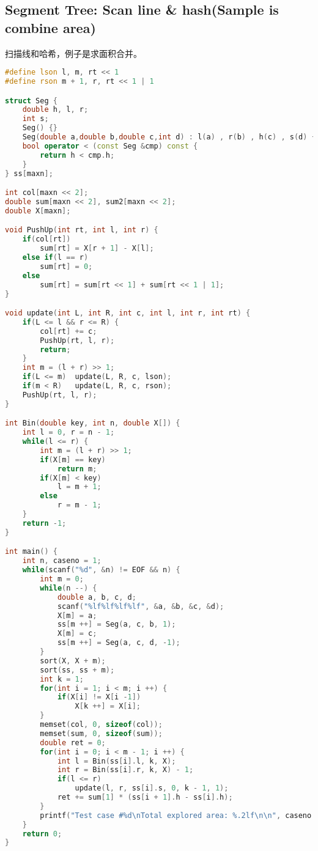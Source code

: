 \subsection{Segment Tree: Scan line & hash(Sample is combine area)}
    扫描线和哈希，例子是求面积合并。
    \begin{lstlisting}[language=c++]
#define lson l, m, rt << 1
#define rson m + 1, r, rt << 1 | 1

struct Seg {
    double h, l, r;
    int s; 
    Seg() {}
    Seg(double a,double b,double c,int d) : l(a) , r(b) , h(c) , s(d) {}
	bool operator < (const Seg &cmp) const {
		return h < cmp.h;
	}
} ss[maxn];

int col[maxn << 2];
double sum[maxn << 2], sum2[maxn << 2];
double X[maxn];

void PushUp(int rt, int l, int r) {
    if(col[rt])
        sum[rt] = X[r + 1] - X[l];
    else if(l == r)
        sum[rt] = 0;
    else
        sum[rt] = sum[rt << 1] + sum[rt << 1 | 1];
}

void update(int L, int R, int c, int l, int r, int rt) {
    if(L <= l && r <= R) {
        col[rt] += c;
        PushUp(rt, l, r);
        return;
    }
    int m = (l + r) >> 1;
    if(L <= m)  update(L, R, c, lson);
    if(m < R)   update(L, R, c, rson);
    PushUp(rt, l, r);
}

int Bin(double key, int n, double X[]) {
    int l = 0, r = n - 1;
    while(l <= r) {
        int m = (l + r) >> 1;
        if(X[m] == key) 
            return m;
        if(X[m] < key)  
            l = m + 1;
        else
            r = m - 1;
    }
    return -1;
}

int main() {
    int n, caseno = 1;
    while(scanf("%d", &n) != EOF && n) {
        int m = 0;
        while(n --) {
            double a, b, c, d;
            scanf("%lf%lf%lf%lf", &a, &b, &c, &d);
            X[m] = a;
            ss[m ++] = Seg(a, c, b, 1);
            X[m] = c;
            ss[m ++] = Seg(a, c, d, -1);
        }
        sort(X, X + m);
        sort(ss, ss + m);
        int k = 1;
        for(int i = 1; i < m; i ++) {
            if(X[i] != X[i -1])
                X[k ++] = X[i];
        }
        memset(col, 0, sizeof(col));
        memset(sum, 0, sizeof(sum));
        double ret = 0;
        for(int i = 0; i < m - 1; i ++) {
            int l = Bin(ss[i].l, k, X);
            int r = Bin(ss[i].r, k, X) - 1;
            if(l <= r)
                update(l, r, ss[i].s, 0, k - 1, 1);
            ret += sum[1] * (ss[i + 1].h - ss[i].h);
        }
        printf("Test case #%d\nTotal explored area: %.2lf\n\n", caseno ++, ret);
    }
    return 0;
}
    \end{lstlisting}
